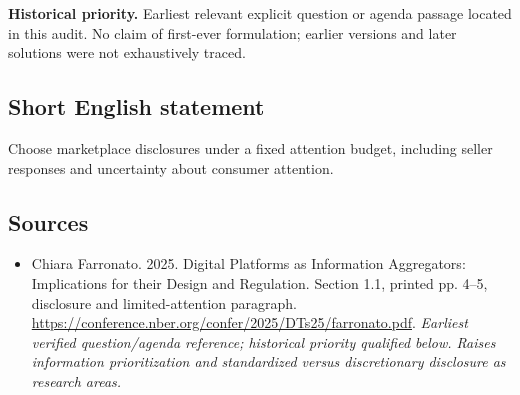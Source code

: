\documentclass[11pt]{article}
\begin{document}
\par\textbf{Historical priority.} Earliest relevant explicit question or agenda passage located in this audit. No claim of first-ever formulation; earlier versions and later solutions were not exhaustively traced.

\subsection{Short English statement}
Choose marketplace disclosures under a fixed attention budget, including seller responses and uncertainty about consumer attention.

\subsection{Sources}
\begin{itemize}\raggedright
\item[\textnormal{[S1]}]\hypertarget{source:30007684:1}{} Chiara Farronato. 2025. Digital Platforms as Information Aggregators: Implications for their Design and Regulation. Section 1.1, printed pp. 4–5, disclosure and limited-attention paragraph.
\url{https://conference.nber.org/confer/2025/DTs25/farronato.pdf}.
{\small\textit{Earliest verified question/agenda reference; historical priority qualified below. Raises information prioritization and standardized versus discretionary disclosure as research areas.}}
\end{itemize}
\end{document}
